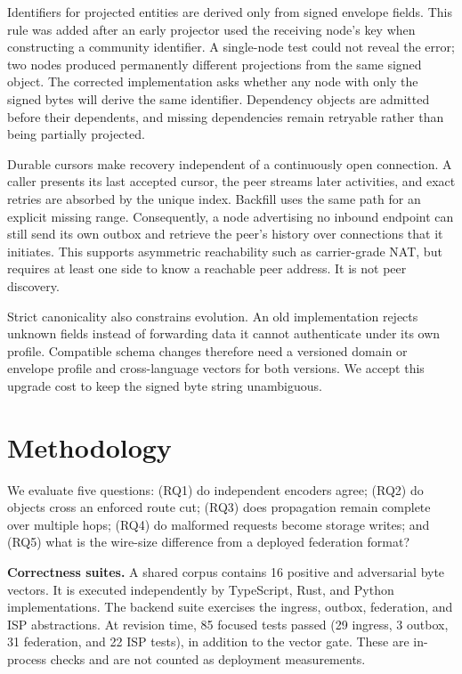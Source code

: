 \documentclass[sigconf,anonymous]{acmart}
\begin{document}
Identifiers for projected entities are derived only from signed envelope fields. This rule was added
after an early projector used the receiving node's key when constructing a community identifier. A
single-node test could not reveal the error; two nodes produced permanently different projections
from the same signed object. The corrected implementation asks whether any node with only the signed
bytes will derive the same identifier. Dependency objects are admitted before their dependents, and
missing dependencies remain retryable rather than being partially projected.

Durable cursors make recovery independent of a continuously open connection. A caller presents its
last accepted cursor, the peer streams later activities, and exact retries are absorbed by the unique
index. Backfill uses the same path for an explicit missing range. Consequently, a node advertising no
inbound endpoint can still send its own outbox and retrieve the peer's history over connections that
it initiates. This supports asymmetric reachability such as carrier-grade NAT, but requires at least
one side to know a reachable peer address. It is not peer discovery.

Strict canonicality also constrains evolution. An old implementation rejects unknown fields instead
of forwarding data it cannot authenticate under its own profile. Compatible schema changes therefore
need a versioned domain or envelope profile and cross-language vectors for both versions. We accept
this upgrade cost to keep the signed byte string unambiguous.

\section{Methodology}
\label{sec:method}

We evaluate five questions: (RQ1) do independent encoders agree; (RQ2) do objects cross an enforced
route cut; (RQ3) does propagation remain complete over multiple hops; (RQ4) do malformed requests
become storage writes; and (RQ5) what is the wire-size difference from a deployed federation format?

\textbf{Correctness suites.} A shared corpus contains 16 positive and adversarial byte vectors. It is
executed independently by TypeScript, Rust, and Python implementations. The backend suite exercises
the ingress, outbox, federation, and ISP abstractions. At revision time, 85 focused tests passed (29
ingress, 3 outbox, 31 federation, and 22 ISP tests), in addition to the vector gate. These are
in-process checks and are not counted as deployment measurements.
\end{document}
